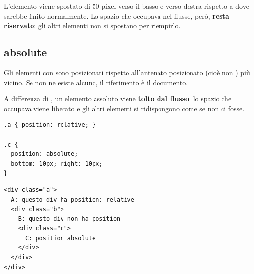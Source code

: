 L'elemento viene spostato di 50 pixel verso il basso e verso destra rispetto a
dove sarebbe finito normalmente. Lo spazio che occupava nel flusso, però,
\textbf{resta riservato}: gli altri elementi non si spostano per riempirlo.

\subsection{absolute}

Gli elementi con  sono posizionati rispetto
all'antenato posizionato (cioè non ) più vicino. Se non ne esiste
alcuno, il riferimento è il documento.

A differenza di , un elemento assoluto viene \textbf{tolto dal
flusso}: lo spazio che occupava viene liberato e gli altri elementi si
ridispongono come se non ci fosse.

\begin{affianco}[0.45]
\begin{lstlisting}[style=css, name=absolute.css]
.a { position: relative; }

.c {
  position: absolute;
  bottom: 10px; right: 10px;
}
\end{lstlisting}
\begin{lstlisting}[style=html, name=absolute.html]
<div class="a">
  A: questo div ha position: relative
  <div class="b">
    B: questo div non ha position
    <div class="c">
      C: position absolute
    </div>
  </div>
</div>
\end{lstlisting}
\risultato
\begin{browser}
\end{browser}
\end{affianco}


